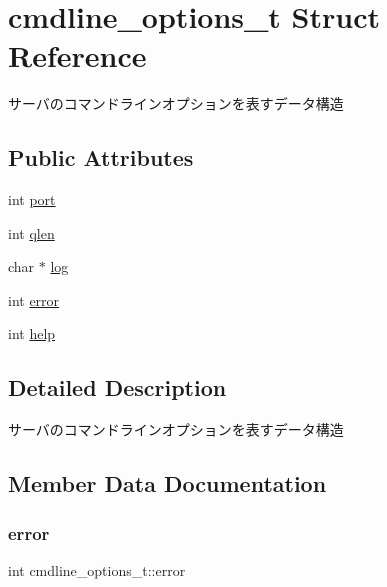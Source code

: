 \hypertarget{structcmdline__options__t}{}\section{cmdline\+\_\+options\+\_\+t Struct Reference}
\label{structcmdline__options__t}


サーバのコマンドラインオプションを表すデータ構造  


\subsection*{Public Attributes}
\begin{DoxyCompactItemize}
\item 
int \hyperlink{structcmdline__options__t_af2128a9d51a25bcf0c62e6c380f40d5b}{port}
\item 
int \hyperlink{structcmdline__options__t_abfb9636e391795e6859dea0419dc199f}{qlen}
\item 
char $\ast$ \hyperlink{structcmdline__options__t_acaaaf78bacddf9ff0779a4956978fd06}{log}
\item 
int \hyperlink{structcmdline__options__t_a25f9087b240da0b93a4295fa5f173c88}{error}
\item 
int \hyperlink{structcmdline__options__t_ab02741e43bb19900e87caaec3a8dd794}{help}
\end{DoxyCompactItemize}


\subsection{Detailed Description}
サーバのコマンドラインオプションを表すデータ構造 

\subsection{Member Data Documentation}
\mbox{\label{structcmdline__options__t_a25f9087b240da0b93a4295fa5f173c88}} 
\subsubsection{\texorpdfstring{error}{error}}
{\footnotesize\ttfamily int cmdline\+\_\+options\+\_\+t\+::error}

